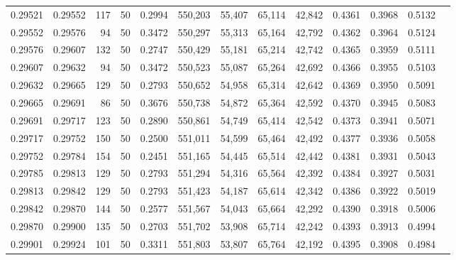 \begin{tabular}{rrrrrrrrrrrrr}
0.29521 & 0.29552 &   117 &  50 &                                     0.2994 & 550,203 &  55,407 &  65,114 &  42,842 & 0.4361 & 0.3968 & 0.5132 \\
0.29552 & 0.29576 &    94 &  50 &                                     0.3472 & 550,297 &  55,313 &  65,164 &  42,792 & 0.4362 & 0.3964 & 0.5124 \\
0.29576 & 0.29607 &   132 &  50 &                                     0.2747 & 550,429 &  55,181 &  65,214 &  42,742 & 0.4365 & 0.3959 & 0.5111 \\
0.29607 & 0.29632 &    94 &  50 &                                     0.3472 & 550,523 &  55,087 &  65,264 &  42,692 & 0.4366 & 0.3955 & 0.5103 \\
0.29632 & 0.29665 &   129 &  50 &                                     0.2793 & 550,652 &  54,958 &  65,314 &  42,642 & 0.4369 & 0.3950 & 0.5091 \\
0.29665 & 0.29691 &    86 &  50 &                                     0.3676 & 550,738 &  54,872 &  65,364 &  42,592 & 0.4370 & 0.3945 & 0.5083 \\
0.29691 & 0.29717 &   123 &  50 &                                     0.2890 & 550,861 &  54,749 &  65,414 &  42,542 & 0.4373 & 0.3941 & 0.5071 \\
0.29717 & 0.29752 &   150 &  50 &                                     0.2500 & 551,011 &  54,599 &  65,464 &  42,492 & 0.4377 & 0.3936 & 0.5058 \\
0.29752 & 0.29784 &   154 &  50 &                                     0.2451 & 551,165 &  54,445 &  65,514 &  42,442 & 0.4381 & 0.3931 & 0.5043 \\
0.29785 & 0.29813 &   129 &  50 &                                     0.2793 & 551,294 &  54,316 &  65,564 &  42,392 & 0.4384 & 0.3927 & 0.5031 \\
0.29813 & 0.29842 &   129 &  50 &                                     0.2793 & 551,423 &  54,187 &  65,614 &  42,342 & 0.4386 & 0.3922 & 0.5019 \\
0.29842 & 0.29870 &   144 &  50 &                                     0.2577 & 551,567 &  54,043 &  65,664 &  42,292 & 0.4390 & 0.3918 & 0.5006 \\
0.29870 & 0.29900 &   135 &  50 &                                     0.2703 & 551,702 &  53,908 &  65,714 &  42,242 & 0.4393 & 0.3913 & 0.4994 \\
0.29901 & 0.29924 &   101 &  50 &                                     0.3311 & 551,803 &  53,807 &  65,764 &  42,192 & 0.4395 & 0.3908 & 0.4984 \\

\end{tabular}
